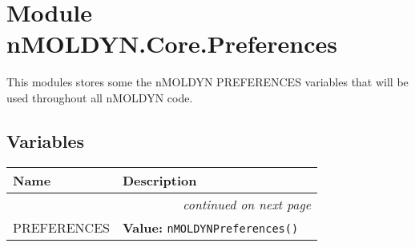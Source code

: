 %
%
%


\section{Module nMOLDYN.Core.Preferences}

    \label{nMOLDYN:Core:Preferences}
This modules stores some the nMOLDYN PREFERENCES variables that will be 
used throughout all nMOLDYN code.



  \subsection{Variables}

    \vspace{-1cm}
\hspace{\varindent}\begin{longtable}{|p{\varnamewidth}|p{\vardescrwidth}|l}
\cline{1-2}
\cline{1-2} \centering \textbf{Name} & \centering \textbf{Description}& \\
\cline{1-2}
\endhead\cline{1-2}\multicolumn{3}{r}{\small\textit{continued on next page}}\\\endfoot\cline{1-2}
\endlastfoot\raggedright P\-R\-E\-F\-E\-R\-E\-N\-C\-E\-S\- & \raggedright \textbf{Value:} 
{\tt nMOLDYNPreferences()}&\\
\cline{1-2}
\end{longtable}



